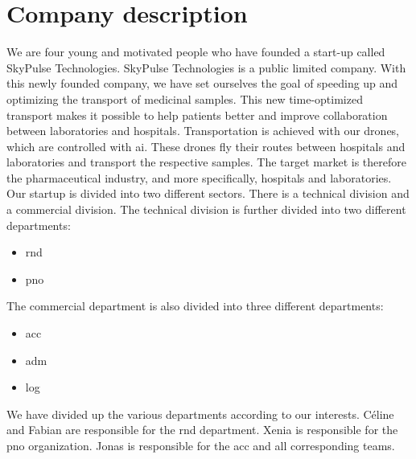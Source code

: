 \chapter{Company description} \label{description}

We are four young and motivated people who have founded a start-up called SkyPulse Technologies. SkyPulse Technologies is a public limited company. With this newly founded company, we have set ourselves the goal of speeding up and optimizing the transport of medicinal samples. This new time-optimized transport makes it possible to help patients better and improve collaboration between laboratories and hospitals. Transportation is achieved with our drones, which are controlled with \ac{ai}. These drones fly their routes between hospitals and laboratories and transport the respective samples.
\newline
The target market is therefore the pharmaceutical industry, and more specifically, hospitals and laboratories.
\newline
Our startup is divided into two different sectors. There is a technical division and a commercial division. The technical division is further divided into two different departments:
\begin{itemize}
  \item \acl{rnd}
  \item \acl{pno}
\end{itemize}
The commercial department is also divided into three different departments:
\begin{itemize}
  \item \acl{acc}
  \item \acl{adm}
  \item \acl{log}
\end{itemize}
We have divided up the various departments according to our interests. Céline and Fabian are responsible for the \acl{rnd} department. Xenia is responsible for the \acl{pno} organization. Jonas is responsible for the \acl{acc} and all corresponding teams.